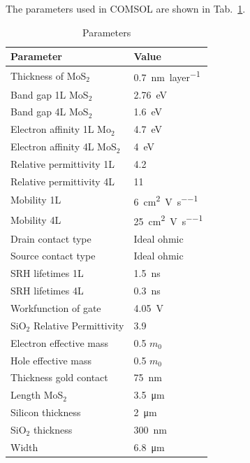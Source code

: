 \documentclass[electronics,article,submit,moreauthors,pdftex]{Definitions/mdpi}
\begin{document}
The parameters used in COMSOL are shown in Tab.~\ref{table:MoS2}.

\begin{table}[H]
	\centering
	\begin{tabular}{l l}
		\toprule
		\textbf{Parameter}	       & \textbf{Value}			 \\
		\midrule
		Thickness of MoS$_2$       & \SI{0.7}{\nano \meter \per layer}              \\
		Band gap 1L MoS$_2$        & \SI{2.76} {\electronvolt}                  \\
		Band gap 4L MoS$_2$        & \SI{1.6} {\electronvolt}                   \\
		Electron affinity 1L Mo$_2$& \SI{4.7} {\electronvolt}                   \\
		Electron affinity 4L MoS$_2$& \SI{4} {\electronvolt}                    \\
		Relative permittivity 1L   & 4.2                      \\
		Relative permittivity 4L   & 11                       \\
		Mobility 1L                & \SI{6} {\square \centi \meter \per \volt \per \second}	  \\
		Mobility 4L                & \SI{25} {\square \centi \meter \per \volt \per \second}  \\
		Drain contact type         & Ideal ohmic              \\
		Source contact type        & Ideal ohmic              \\
		SRH lifetimes 1L           & \SI{1.5} {\nano \second}                   \\
		SRH lifetimes 4L           & \SI{0.3} {\nano \second}                   \\
		Workfunction of gate       & \SI{4.05} {\volt}                   \\
		SiO$_2$ Relative Permittivity & 3.9                   \\
		Electron effective mass    & 0.5 $m_0$            	  \\
		Hole effective mass        & 0.5 $m_0$           	  \\
		Thickness gold contact     & \SI{75} {\nano \meter}                    \\
		Length MoS$_2$             & \SI{3.5} {\micro \meter}              \\
		Silicon thickness          & \SI{2} {\micro \meter}                 \\
		SiO$_2$ thickness          & \SI{300} {\nano \meter}	                  \\
		Width                      & \SI{6.8} {\micro \meter}              \\
		\bottomrule
	\end{tabular}
	\caption{Parameters}
	\label{table:MoS2}
\end{table}
\end{document}
